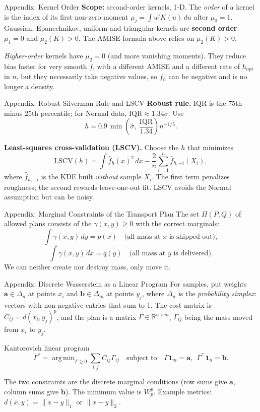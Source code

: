 \documentclass[10pt,aspectratio=169]{ntuabeamer}
\newcommand{\R}{\mathbb{R}}
\DeclareMathOperator*{\argmin}{arg\,min}
\begin{document}
	\begin{frame}{Appendix: Kernel Order}
		\small
		\textbf{Scope:} second-order kernels, 1-D.
		The \emph{order} of a kernel is the index of its first non-zero moment $\mu_j=\int u^jK(u)\,du$ after $\mu_0=1$.
		Gaussian, Epanechnikov, uniform and triangular kernels are \textbf{second order}: $\mu_1=0$ and $\mu_2(K)>0$.
		The AMISE formula above relies on $\mu_2(K)>0$.

		\medskip
		\emph{Higher-order} kernels have $\mu_2=0$ (and more vanishing moments). They reduce bias faster for very smooth $f$,
		with a different AMISE and a different rate of $h_{\mathrm{opt}}$ in $n$, but they necessarily take negative values,
		so $\hat f_h$ can be negative and is no longer a density.
	\end{frame}

	\begin{frame}{Appendix: Robust Silverman Rule and LSCV}
		\small
		\textbf{Robust rule.} IQR is the 75th minus 25th percentile; for Normal data, $\mathrm{IQR}\approx1.34\sigma$. Use
		$$ h = 0.9\,\min\!\left(\hat\sigma,\ \frac{\mathrm{IQR}}{1.34}\right) n^{-1/5}. $$

		\medskip
		\textbf{Least-squares cross-validation (LSCV).} Choose the $h$ that minimizes
		$$ \mathrm{LSCV}(h)=\int \hat f_h(x)^2\,dx-\frac{2}{n}\sum_{i=1}^n \hat f_{h,-i}(X_i), $$
		where $\hat f_{h,-i}$ is the KDE built \emph{without} sample $X_i$.
		The first term penalizes roughness; the second rewards leave-one-out fit. LSCV avoids the Normal assumption but can be noisy.
	\end{frame}

	\begin{frame}{Appendix: Marginal Constraints of the Transport Plan}
		\small
		The set $\Pi(P,Q)$ of allowed plans consists of the $\gamma(x,y)\ge 0$ with the correct marginals:
		$$ \int \gamma(x, y)\, dy = p(x) \quad \text{(all mass at } x \text{ is shipped out)}, $$
		$$ \int \gamma(x, y)\, dx = q(y) \quad \text{(all mass at } y \text{ is delivered)}. $$
		We can neither create nor destroy mass, only move it.
	\end{frame}

	\begin{frame}{Appendix: Discrete Wasserstein as a Linear Program}
		\small
		For samples, put weights $\mathbf a\in\Delta_n$ at points $x_i$ and $\mathbf b\in\Delta_m$ at points $y_j$,
		where $\Delta_n$ is the \emph{probability simplex}: vectors with non-negative entries that sum to 1.
		The cost matrix is $C_{ij}=d(x_i,y_j)^p$, and the plan is a matrix $\Gamma\in\R^{n\times m}$, $\Gamma_{ij}$ being the mass moved from $x_i$ to $y_j$.

		\begin{block}{Kantorovich linear program}
			$$ \Gamma^* = \argmin_{\Gamma\ge 0} \sum_{i,j} C_{ij}\Gamma_{ij}
				\quad\text{subject to}\quad \Gamma \mathbf{1}_m = \mathbf{a},\ \ \Gamma^{\top} \mathbf{1}_n = \mathbf{b}. $$
		\end{block}
		The two constraints are the discrete marginal conditions (row sums give $\mathbf a$, column sums give $\mathbf b$).
		The minimum value is $W_p^p$. Example metrics: $d(x,y)=\|x-y\|_1$ or $\|x-y\|_2$.
	\end{frame}
\end{document}
